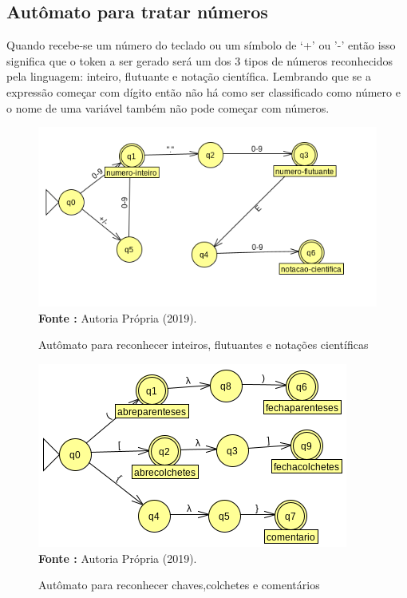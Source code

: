 \documentclass[12pt]{article}
\begin{document}
\subsection{Autômato para tratar números}  
Quando recebe-se um número do teclado ou um símbolo de `+' ou '-' então isso significa que o token a ser gerado será um dos 3 tipos de números reconhecidos pela linguagem: inteiro, flutuante e notação científica. Lembrando que se a expressão começar com dígito então não há como ser classificado como número e o nome de uma variável também não pode começar com números.  
\begin{figure}[H]   
	\centering 
	\caption{Autômato para reconhecer inteiros, flutuantes e notações científicas}
	\includegraphics[scale=0.7]{numeros}\\ 
	\textbf{Fonte :} Autoria Própria (2019). 
\end{figure}  

\begin{figure}[H]  
	\centering 
	\caption{Autômato para reconhecer chaves,colchetes e comentários}
	\includegraphics[scale=0.7]{chaves}\\ 
	\textbf{Fonte :} Autoria Própria (2019). 
	
\end{figure} 
\end{document}
